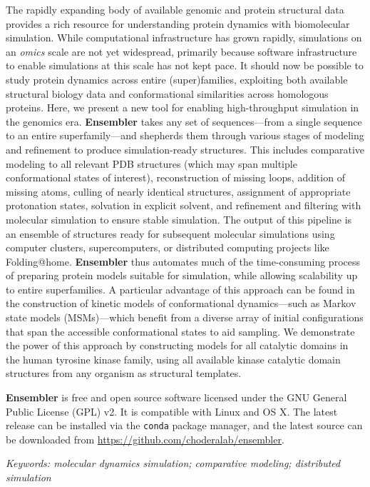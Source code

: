\documentclass[aps,prl,preprint,nofootinbib,superscriptaddress,linenumbers]{revtex4-1}
\begin{document}
The rapidly expanding body of available genomic and protein structural data provides a rich resource for understanding protein dynamics with biomolecular simulation. 
While computational infrastructure has grown rapidly, simulations on an \emph{omics} scale are not yet widespread, primarily because software infrastructure to enable simulations at this scale has not kept pace. 
It should now be possible to study protein dynamics across entire (super)families, exploiting both available structural biology data and conformational similarities across homologous proteins.
Here, we present a new tool for enabling high-throughput simulation in the genomics era.
{\bf Ensembler} takes any set of sequences---from a single sequence to an entire superfamily---and shepherds them through various stages of modeling and refinement to produce simulation-ready structures.
This includes comparative modeling to all relevant PDB structures (which may span multiple conformational states of interest), reconstruction of missing loops, addition of missing atoms, culling of nearly identical structures, assignment of appropriate protonation states, solvation in explicit solvent, and refinement and filtering with molecular simulation to ensure stable simulation. 
The output of this pipeline is an ensemble of structures ready for subsequent molecular simulations using computer clusters, supercomputers, or distributed computing projects like Folding@home.
{\bf Ensembler} thus automates much of the time-consuming process of preparing protein models suitable for simulation, while allowing scalability up to entire superfamilies.
A particular advantage of this approach can be found in the construction of kinetic models of conformational dynamics---such as Markov state models (MSMs)---which benefit from a diverse array of initial configurations that span the accessible conformational states to aid sampling.
We demonstrate the power of this approach by constructing models for all catalytic domains in the human tyrosine kinase family, using all available kinase catalytic domain structures from any organism as structural templates.

{\bf Ensembler} is free and open source software licensed under the GNU General Public License (GPL) v2. 
It is compatible with Linux and OS X.
The latest release can be installed via the {\tt conda} package manager, and the latest source can be downloaded from \url{https://github.com/choderalab/ensembler}.

\emph{Keywords: molecular dynamics simulation; comparative modeling; distributed simulation}
\end{document}

